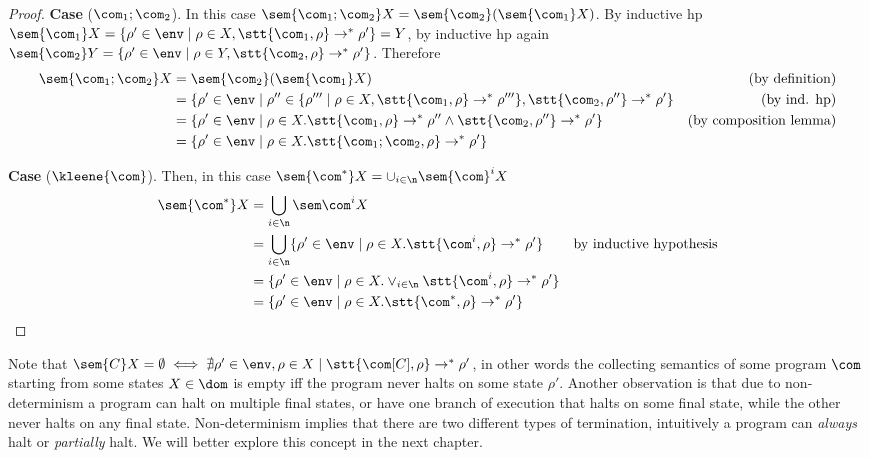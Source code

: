\begin{proof}
  \noindent
  \textbf{Case} (\(\com_1;\com_2\)). In this case
  \(\sem{\com_1;\com_2}X = \sem{\com_2}(\sem{\com_1}X)\). By inductive
  hp
  \(\sem{\com_1}X = \{\rho' \in\env \mid \rho \in X, \stt{\com_1,
    \rho} \to^* \rho'\} = Y\), by inductive hp again
  \(\sem{\com_2}Y = \{\rho' \in\env \mid \rho \in Y, \stt{\com_2,
    \rho} \to^* \rho'\}\). Therefore
  \begin{align*}
    \sem{\com_1;\com_2}X & = \sem{\com_2}(\sem{\com_1}X) & \text{(by definition)}\\
                         & = \{\rho' \in\env \mid \rho'' \in \{\rho''' \mid \rho \in X, \stt{\com_1, \rho}  \to^* \rho'''\}, \stt{\com_2, \rho''} \to^* \rho'\} & \text{(by ind. hp)}\\
                         & = \{\rho' \in\env \mid \rho \in X . \stt{\com_1, \rho} \to^* \rho'' \wedge \stt{\com_2, \rho''} \to^* \rho'\} & \text{(by composition lemma)}\\
                         & = \{\rho' \in\env \mid \rho \in X . \stt{\com_1;\com_2, \rho} \to^* \rho'\}
  \end{align*}

  \medskip

  \noindent
  \textbf{Case} (\(\kleene{\com}\)).  Then, in this case
  \(\sem{\com^*}X = \cup_{i\in\n}\sem{\com}^i X\)
  \begin{align*}
    \sem{\com^*}X & = \bigcup_{i\in\n} \sem\com^i X \\
                  & = \bigcup_{i\in\n} \{\rho' \in\env \mid \rho \in X . \stt{\com^i, \rho} \to^*  \rho'\} & \text{by inductive hypothesis}\\
                  & = \{\rho' \in\env \mid \rho \in X . \vee_{i\in\n} \stt{\com^i, \rho} \to^* \rho'\} \\
                  & = \{\rho' \in\env \mid \rho \in X . \stt{\com^*, \rho} \to^* \rho'\}
  \end{align*} 
\end{proof}

Note that
\(\sem{C}X = \emptyset \iff \nexists \rho'\in\env, \rho \in X \mid
\stt{\com[C],\rho} \to^* \rho'\), in other words the collecting
semantics of some program \(\com\) starting from some states
\(X\in\dom\) is empty iff the program never halts on some state
\(\rho'\). Another observation is that due to non-determinism a
program can halt on multiple final states, or have one branch of
execution that halts on some final state, while the other never halts
on any final state. Non-determinism implies that there are two
different types of termination, intuitively a program can
\emph{always} halt or \emph{partially} halt. We will better explore
this concept in the next chapter.
